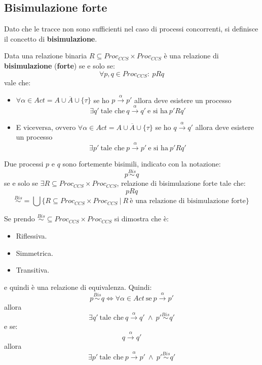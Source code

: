 \subsection{Bisimulazione forte}
Dato che le tracce non sono sufficienti nel caso di processi concorrenti, si
definisce il concetto di \textbf{bisimulazione}.
\begin{definizione}
    Data una relazione binaria $R \subseteq Proc_{CCS} \times Proc_{CCS}$ è una
    relazione di \textbf{bisimulazione} (\textbf{forte}) se e solo se:
    $$\forall p, q \in Proc_{CCS}: \ p R q$$ vale che:
    \begin{itemize}
        \item $\forall \alpha \in Act = A \cup \overline{A} \cup \{\tau\}$ se ho
              $p \xrightarrow{\alpha} p'$ allora deve esistere un processo
              $$\exists q' \ \text{tale che} \ q \xrightarrow{\alpha} q' \ \text{e si ha} \ p'Rq'$$
        \item E viceversa, ovvero $\forall \alpha \in Act = A \cup \overline{A} \cup \{\tau\}$
              se ho $q \xrightarrow{\alpha} q'$ allora deve esistere un processo
              $$\exists p' \ \text{tale che} \ p \xrightarrow{\alpha} p' \ \text{e si ha} \ p'Rq'$$
    \end{itemize}
    Due processi $p$ e $q$ sono fortemente bisimili, indicato con la notazione:
    $$p \stackrel{Bis}{\sim} q$$ se e solo se $\exists R \subseteq Proc_{CCS} \times Proc_{CCS}$,
    relazione di bisimulazione forte tale che: $$p R q$$
    $$\stackrel{Bis}{\sim} = \bigcup \{R \subseteq Proc_{CCS} \times Proc_{CCS} \ | \ R \ \text{è una relazione di bisimulazione forte}\}$$
\end{definizione}
\begin{teorema}
    Se prendo $\stackrel{Bis}{\sim}  \subseteq Proc_{CCS} \times Proc_{CCS}$ si
    dimostra che è:
    \begin{itemize}
        \item Riflessiva.
        \item Simmetrica.
        \item Transitiva.
    \end{itemize}
    e quindi è una relazione di equivalenza. Quindi:
    $$p \stackrel{Bis}{\sim} q \Longleftrightarrow \forall \alpha \in Act \ \text{se} \ p \xrightarrow{\alpha} p'$$
    allora $$\exists q' \ \text{tale che} \ q \xrightarrow{\alpha} q' \ \land \ p' \stackrel{Bis}{\sim} q'$$
    e se: $$q \xrightarrow{\alpha} q'$$ allora
    $$\exists p' \ \text{tale che} \ p \xrightarrow{\alpha} p' \ \land \ p' \stackrel{Bis}{\sim} q'$$
\end{teorema}
